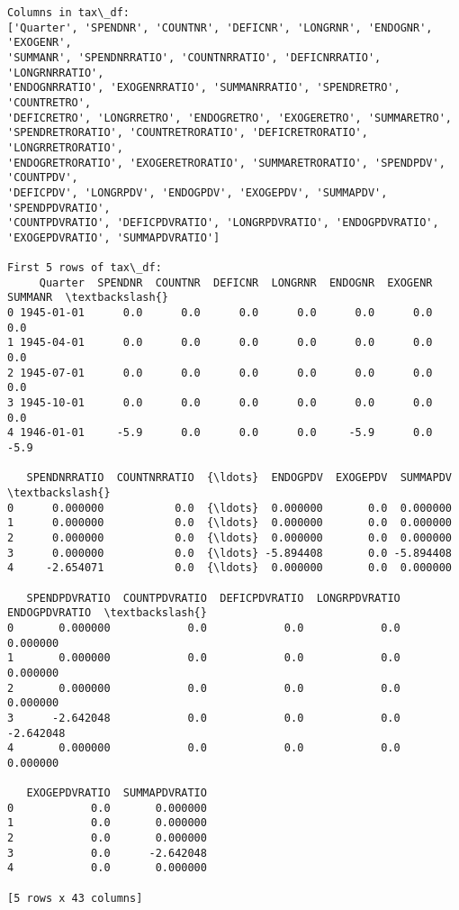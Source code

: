 \documentclass[11pt]{article}
\begin{document}
    \begin{Verbatim}[commandchars=\\\{\}]
Columns in tax\_df:
['Quarter', 'SPENDNR', 'COUNTNR', 'DEFICNR', 'LONGRNR', 'ENDOGNR', 'EXOGENR',
'SUMMANR', 'SPENDNRRATIO', 'COUNTNRRATIO', 'DEFICNRRATIO', 'LONGRNRRATIO',
'ENDOGNRRATIO', 'EXOGENRRATIO', 'SUMMANRRATIO', 'SPENDRETRO', 'COUNTRETRO',
'DEFICRETRO', 'LONGRRETRO', 'ENDOGRETRO', 'EXOGERETRO', 'SUMMARETRO',
'SPENDRETRORATIO', 'COUNTRETRORATIO', 'DEFICRETRORATIO', 'LONGRRETRORATIO',
'ENDOGRETRORATIO', 'EXOGERETRORATIO', 'SUMMARETRORATIO', 'SPENDPDV', 'COUNTPDV',
'DEFICPDV', 'LONGRPDV', 'ENDOGPDV', 'EXOGEPDV', 'SUMMAPDV', 'SPENDPDVRATIO',
'COUNTPDVRATIO', 'DEFICPDVRATIO', 'LONGRPDVRATIO', 'ENDOGPDVRATIO',
'EXOGEPDVRATIO', 'SUMMAPDVRATIO']

First 5 rows of tax\_df:
     Quarter  SPENDNR  COUNTNR  DEFICNR  LONGRNR  ENDOGNR  EXOGENR  SUMMANR  \textbackslash{}
0 1945-01-01      0.0      0.0      0.0      0.0      0.0      0.0      0.0
1 1945-04-01      0.0      0.0      0.0      0.0      0.0      0.0      0.0
2 1945-07-01      0.0      0.0      0.0      0.0      0.0      0.0      0.0
3 1945-10-01      0.0      0.0      0.0      0.0      0.0      0.0      0.0
4 1946-01-01     -5.9      0.0      0.0      0.0     -5.9      0.0     -5.9

   SPENDNRRATIO  COUNTNRRATIO  {\ldots}  ENDOGPDV  EXOGEPDV  SUMMAPDV  \textbackslash{}
0      0.000000           0.0  {\ldots}  0.000000       0.0  0.000000
1      0.000000           0.0  {\ldots}  0.000000       0.0  0.000000
2      0.000000           0.0  {\ldots}  0.000000       0.0  0.000000
3      0.000000           0.0  {\ldots} -5.894408       0.0 -5.894408
4     -2.654071           0.0  {\ldots}  0.000000       0.0  0.000000

   SPENDPDVRATIO  COUNTPDVRATIO  DEFICPDVRATIO  LONGRPDVRATIO  ENDOGPDVRATIO  \textbackslash{}
0       0.000000            0.0            0.0            0.0       0.000000
1       0.000000            0.0            0.0            0.0       0.000000
2       0.000000            0.0            0.0            0.0       0.000000
3      -2.642048            0.0            0.0            0.0      -2.642048
4       0.000000            0.0            0.0            0.0       0.000000

   EXOGEPDVRATIO  SUMMAPDVRATIO
0            0.0       0.000000
1            0.0       0.000000
2            0.0       0.000000
3            0.0      -2.642048
4            0.0       0.000000

[5 rows x 43 columns]


\end{Verbatim}
\end{document}
